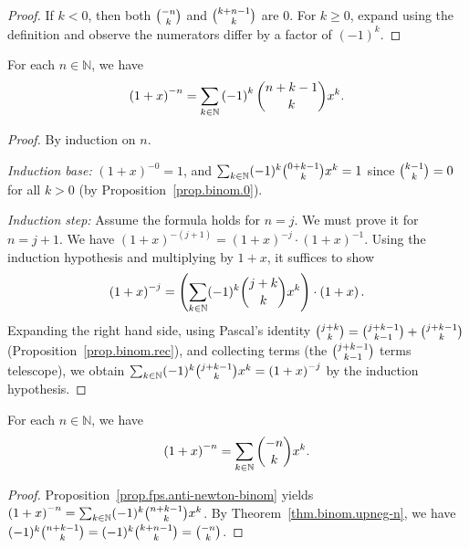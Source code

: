 \begin{proof}
\leanok
If $k<0$, then both $\dbinom{-n}{k}$ and $\dbinom{k+n-1}{k}$ are $0$.
For $k\geq 0$, expand using the definition and
observe the numerators differ by a factor of $(-1)^k$.
\end{proof}

\begin{proposition}
\label{prop.fps.anti-newton-binom}
\leantarget
\leanok
For each $n\in\mathbb{N}$, we have%
\[
\left(1+x\right)^{-n}=\sum_{k\in\mathbb{N}}\left(-1\right)^{k}%
\dbinom{n+k-1}{k}x^{k}.
\]
\end{proposition}

\begin{proof}
By induction on $n$.

\textit{Induction base:} $\left(1+x\right)^{-0} = 1$, and
$\sum_{k\in\mathbb{N}} (-1)^k \dbinom{0+k-1}{k} x^k = 1$
since $\dbinom{k-1}{k} = 0$ for all $k > 0$ (by Proposition~\ref{prop.binom.0}).

\textit{Induction step:} Assume the formula holds for $n = j$. We must prove it for $n = j+1$.
We have $\left(1+x\right)^{-(j+1)} = \left(1+x\right)^{-j} \cdot \left(1+x\right)^{-1}$.
Using the induction hypothesis and multiplying by $1+x$, it suffices to show
\[
\left(1+x\right)^{-j} = \left(\sum_{k\in\mathbb{N}} (-1)^k \dbinom{j+k}{k} x^k\right) \cdot \left(1+x\right).
\]
Expanding the right hand side, using Pascal's identity
$\dbinom{j+k}{k} = \dbinom{j+k-1}{k-1} + \dbinom{j+k-1}{k}$
(Proposition~\ref{prop.binom.rec}), and collecting terms (the
$\dbinom{j+k-1}{k-1}$ terms telescope), we obtain
$\sum_{k\in\mathbb{N}} (-1)^k \dbinom{j+k-1}{k} x^k = \left(1+x\right)^{-j}$
by the induction hypothesis.
\end{proof}

\begin{corollary}
\label{cor.fps.anti-newton-binom-2}
\leantarget
\leanok
For each $n\in\mathbb{N}$, we have%
\[
\left(1+x\right)^{-n}=\sum_{k\in\mathbb{N}}\dbinom{-n}{k}x^{k}.
\]
\end{corollary}

\begin{proof}
\leanok
Proposition~\ref{prop.fps.anti-newton-binom} yields
$\left(1+x\right)^{-n} = \sum_{k\in\mathbb{N}} (-1)^k \dbinom{n+k-1}{k} x^k$.
By Theorem~\ref{thm.binom.upneg-n}, we have
$(-1)^k \dbinom{n+k-1}{k} = (-1)^k \dbinom{k+n-1}{k} = \dbinom{-n}{k}$.
\end{proof}

